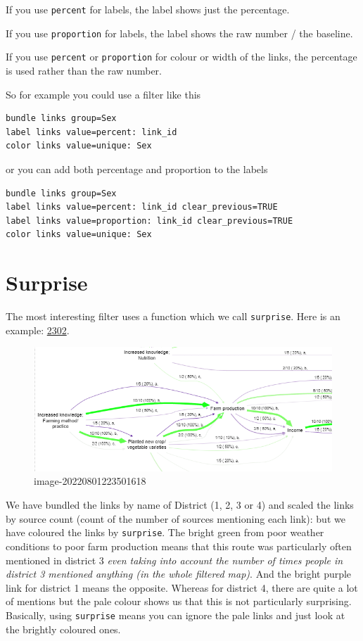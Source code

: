\documentclass[
]{book}
\begin{document}
If you use \texttt{percent} for labels, the label shows just the percentage.

If you use \texttt{proportion} for labels, the label shows the raw number / the baseline.

If you use \texttt{percent} or \texttt{proportion} for colour or width of the links, the percentage is used rather than the raw number.

So for example you could use a filter like this

\begin{verbatim}
bundle links group=Sex
label links value=percent: link_id
color links value=unique: Sex
\end{verbatim}

or you can add both percentage and proportion to the labels

\begin{verbatim}
bundle links group=Sex
label links value=percent: link_id clear_previous=TRUE
label links value=proportion: link_id clear_previous=TRUE
color links value=unique: Sex
\end{verbatim}

\hypertarget{xsurprise}{%
\section{Surprise}\label{xsurprise}}

The most interesting filter uses a function which we call \texttt{surprise}. Here is an example: \href{https://causalmap.shinyapps.io/CausalMap2?s=2302}{2302}.

\begin{figure}
\centering
\includegraphics{_assets/image-20220801223501618.png}
\caption{image-20220801223501618}
\end{figure}

We have bundled the links by name of District (1, 2, 3 or 4) and scaled the links by source count (count of the number of sources mentioning each link): but we have coloured the links by \texttt{surprise}. The bright green from poor weather conditions to poor farm production means that this route was particularly often mentioned in district 3 \emph{even taking into account the number of times people in district 3 mentioned anything (in the whole filtered map)}. And the bright purple link for district 1 means the opposite. Whereas for district 4, there are quite a lot of mentions but the pale colour shows us that this is not particularly surprising. Basically, using \texttt{surprise} means you can ignore the pale links and just look at the brightly coloured ones.
\end{document}
